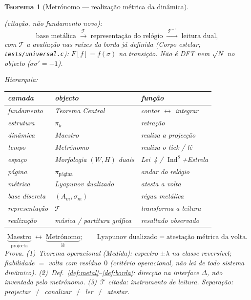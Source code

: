 \documentclass[11pt,a4paper]{article}
\newtheorem{teorema}{Teorema}
\newcommand{\code}[1]{\texttt{#1}}
\begin{document}
\begin{teorema}[Metrónomo --- realização métrica da dinâmica]
\begin{enumerate}
(citação, não fundamento novo):
\[
\text{base metálica}
\;\xrightarrow{\;\mathcal{T}\;}\;
\text{representação do relógio}
\;\xrightarrow{\;\mathcal{T}^{-1}\;}\;
\text{leitura dual},
\]
com $\mathcal{T}$ a avaliação nas raízes da borda já definida
(\emph{Corpo estelar}; \code{tests/universal.c}): $F[f]=f(\sigma)$
na transição. Não é DFT nem $\sqrt N$ no objecto
($\sigma\sigma'=-1$).
\end{enumerate}
Hierarquia:
\begin{center}\small
\begin{tabular}{@{}lll@{}}
camada & objecto & função \\
\hline
fundamento & Teorema Central & contar $\leftrightarrow$ integrar \\
estrutura & $\pi_k$ & retração \\
dinâmica & Maestro & realiza a projecção \\
tempo & Metrónomo & realiza o tick / lê \\
espaço & Morfologia $(W,H)$ duais & Lei~4 / $\operatorname{Ind}^{8}$+Estrela \\
página & $\pi_{\mathrm{página}}$ & andar do relógio \\
métrica & Lyapunov dualizado & atesta a volta \\
base discreta & $(A_m,\sigma_m)$ & régua metálica \\
representação & $\mathcal{T}$ & transforma a leitura \\
realização & música / partitura gráfica & resultado observado \\
\end{tabular}
\end{center}
\[
\boxed{
\underbrace{\text{Maestro}}_{\text{projecta}}
\;\leftrightarrow\;
\underbrace{\text{Metrónomo}}_{\text{lê}};
\qquad
\text{Lyapunov dualizado}=\text{atestação métrica da volta}.
}
\]
\emph{Prova.} (1)~Teorema operacional (\emph{Medida}): espectro
$\pm\lambda$ na classe reversível; fiabilidade $=$ volta com
resíduo~$0$ (critério operacional, não lei de todo sistema dinâmico).
(2)~Def.~\ref{def:metal}--\ref{def:borda}: direcção na interface
$\Delta$, não inventada pelo metrónomo. (3)~$\mathcal{T}$ citada:
instrumento de leitura. Separação:
projectar $\neq$ canalizar $\neq$ ler $\neq$ atestar.
\end{teorema}
\end{document}
